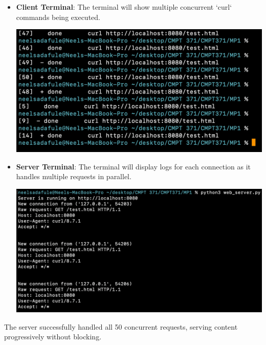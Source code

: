 \documentclass{article}
\begin{document}
\begin{itemize}
    \item \textbf{Client Terminal}: The terminal will show multiple concurrent `curl` commands being executed.
    \begin{center}
    \includegraphics[width=\textwidth]{screenshots/hol_blocking_loop_test_client.png}  %
    \end{center}
    \item \textbf{Server Terminal}: The terminal will display logs for each connection as it handles multiple requests in parallel.
    \begin{center}
    \includegraphics[width=\textwidth]{screenshots/hol_blocking_loop_test_server.png}  %
    \end{center}
\end{itemize}

The server successfully handled all 50 concurrent requests, serving content progressively without blocking.
\end{document}
